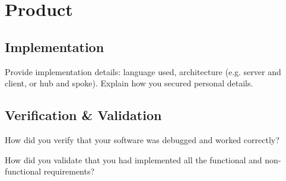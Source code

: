 \section{Product}\label{product}



\subsection{Implementation}
Provide implementation details: language used, architecture (e.g. server and client, or hub and spoke). Explain how you secured personal details.

\subsection{Verification \& Validation}

How did you verify that your software was debugged and worked correctly?

How did you validate that you had implemented all the functional and non-functional requirements?

